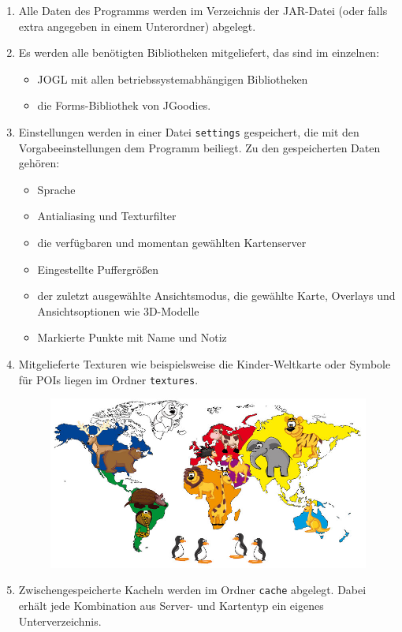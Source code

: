 \documentclass[10pt]{scrreprt}
\newcommand{\ziel}[1]{{\fontsize{9.5}{11}\textsf{/#1/}}}
\newcommand{\ziellabel}{Z}
\newcommand{\muss}{\renewcommand{\labelenumi}{\textbf{\ziel{\ziellabel\numprint{\theenumi}0}}}}
\newcommand{\wunsch}{\renewcommand{\labelenumi}{\textbf{\ziel{\ziellabel\numprint{\theenumi}0W}}}}
\begin{document}
\begin{enumerate}[leftmargin=2cm]
\item Alle Daten des Programms werden im Verzeichnis der JAR-Datei (oder falls extra angegeben in einem Unterordner) abgelegt.
\item Es werden alle benötigten Bibliotheken mitgeliefert, das sind im einzelnen: 
\begin{itemize}
\item JOGL mit allen betriebssystemabhängigen Bibliotheken
\item die Forms-Bibliothek von JGoodies.
\end{itemize}
\wunsch
\item Einstellungen werden in einer Datei \texttt{settings} gespeichert, die mit den Vorgabeeinstellungen dem Programm beiliegt. Zu den gespeicherten Daten gehören:
\begin{itemize}
\item Sprache
\item Antialiasing und Texturfilter
\item die verfügbaren und momentan gewählten Kartenserver
\item Eingestellte Puffergrößen
\item der zuletzt ausgewählte Ansichtsmodus, die gewählte Karte, Overlays und Ansichtsoptionen wie 3D-Modelle
\item Markierte Punkte mit Name und Notiz
\end{itemize}
\muss
\item Mitgelieferte Texturen wie beispielsweise die Kinder-Weltkarte oder Symbole für POIs liegen im Ordner \texttt{textures}.
\begin{figure}[!htb]
	\centering
	\includegraphics[scale=0.3]{Kinder-Weltkarte.jpg}
\end{figure}
\item Zwischengespeicherte Kacheln werden im Ordner \texttt{cache} abgelegt. Dabei erhält jede Kombination aus Server- und Kartentyp ein eigenes Unterverzeichnis.
\end{enumerate}
\end{document}
